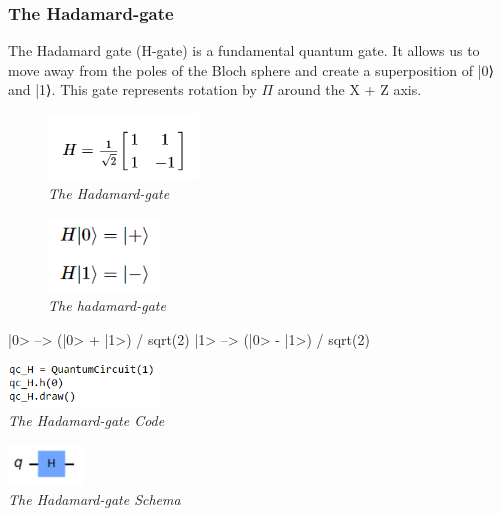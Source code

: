 \documentclass{article}
\begin{document}
\subsubsection{The Hadamard-gate} 
The Hadamard gate (H-gate) is a fundamental quantum gate. It allows us to move away from the poles of the Bloch sphere and create a superposition of |0⟩ and |1⟩. This gate represents rotation by $\Pi$ around the X + Z axis.
\begin{figure}[h]
\begin{center}
\begin{minipage}[b]{4cm}
\centering
\includegraphics[width=4cm]{hadamard_gate.png}\\\textit{The Hadamard-gate}
\end{minipage}
\begin{minipage}[b]{5cm}
\centering
\includegraphics[width=3cm]{hadamard_gate_transformation.png}\\\textit{The hadamard-gate}
\end{minipage}
\end{center}
\end{figure}
\newline
|0>  -->  (|0> + |1>) / sqrt(2)	 \tab |1>  -->  (|0> - |1>) / sqrt(2)
\begin{mdframed}
\begin{center}
\begin{minipage}[b]{4cm}
\centering
\includegraphics[width=4cm]{hadamard_code.png}\\\textit{The Hadamard-gate Code}
\end{minipage}
\begin{minipage}[b]{5cm}
\centering
\includegraphics[width=2cm]{hadamard_schema.png}\\\textit{The Hadamard-gate Schema}
\end{minipage}
\end{center}
\end{mdframed}
\end{document}
